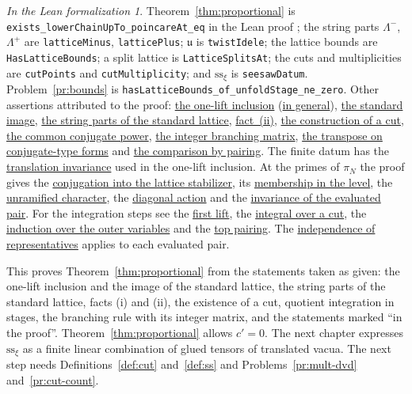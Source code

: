 \documentclass[reqno]{amsart}
\newcounter{chap}
\theoremstyle{definition}
\theoremstyle{plain}
\theoremstyle{remark}
\newtheorem*{leanremark}{In the Lean formalization}
\newcommand{\uu}{\mathfrak{u}}
\newcommand{\ssx}{\mathrm{ss}_\xi}
\newcommand{\tl}[1]{\texttt{#1}}
\newcommand{\gls}[3]{\href{https://github.com/lsernau/grh-lean/blob/72fead1/grh/src/#1.lean\#L#2}{#3}}
\newcommand{\glu}[3]{\gls{New/UpperBound/#1}{#2}{#3}}
\begin{document}
\begin{leanremark}
{\raggedright Theorem~\ref{thm:proportional} is \tl{exists\_lowerChainUpTo\_poincareAt\_eq} in the Lean proof \cite{GL}; the string parts \(\Lambda^-\), \(\Lambda^+\) are \tl{latticeMinus}, \tl{latticePlus}; \(\uu\) is \tl{twistIdele}; the lattice bounds are \tl{HasLatticeBounds}; a split lattice is \tl{LatticeSplitsAt}; the cuts and multiplicities are \tl{cutPoints} and \tl{cutMultiplicity}; and \(\ssx\) is \tl{seesawDatum}.  Problem~\ref{pr:bounds} is \tl{hasLatticeBounds\_of\_unfoldStage\_ne\_zero}.  Other assertions attributed to the proof: \glu{Seesaw/UnfoldingStages}{1141}{the one-lift inclusion} (\glu{Seesaw/Frequency}{307}{in general}), \glu{Seesaw/UnfoldingStages}{1044}{the standard image}, \glu{Seesaw/StandardLines}{301}{the string parts of the standard lattice}, \gls{Lib/Weil/Periods/LatticeBounds}{195}{fact~(ii)}, \glu{Seesaw/IntegralAsCosetSum}{156}{the construction of a cut}, \glu{Seesaw/Cut}{44}{the common conjugate power}, \glu{Objects/Columns}{747}{the integer branching matrix}, \glu{Seesaw/SeesawIdentity}{173}{the transpose on conjugate-type forms} and \glu{Seesaw/SeesawIdentity}{569}{the comparison by pairing}.  The finite datum has the \glu{Seesaw/UnfoldingStages}{977}{translation invariance} used in the one-lift inclusion.  At the primes of \(\pi_N\) the proof gives the \glu{Seesaw/Sandwich}{112}{conjugation into the lattice stabilizer}, its \glu{Seesaw/UnfoldingStages}{1090}{membership in the level}, the \glu{Objects/CharactersAtLevel}{43}{unramified character}, the \glu{Objects/CharactersAtLevel}{73}{diagonal action} and the \glu{Seesaw/UnfoldingStages}{910}{invariance of the evaluated pair}.  For the integration steps see the \glu{Seesaw/SeesawIdentity}{358}{first lift}, the \glu{Seesaw/IntegralAsCosetSum}{367}{integral over a cut}, the \glu{Seesaw/SeesawIdentity}{413}{induction over the outer variables} and the \glu{Seesaw/SeesawIdentity}{90}{top pairing}.  The \glu{Seesaw/UnfoldingStages}{934}{independence of representatives} applies to each evaluated pair.\par}
\end{leanremark}

This proves Theorem~\ref{thm:proportional} from the statements taken as given: the one-lift inclusion and the image of the standard lattice, the string parts of the standard lattice, facts (i) and (ii), the existence of a cut, quotient integration in stages, the branching rule with its integer matrix, and the statements marked ``in the proof''.  Theorem~\ref{thm:proportional} allows \(c'=0\).  The next chapter expresses \(\ssx\) as a finite linear combination of glued tensors of translated vacua.  The next step needs Definitions~\ref{def:cut} and~\ref{def:ss} and Problems~\ref{pr:mult-dvd} and~\ref{pr:cut-count}.
\end{document}
